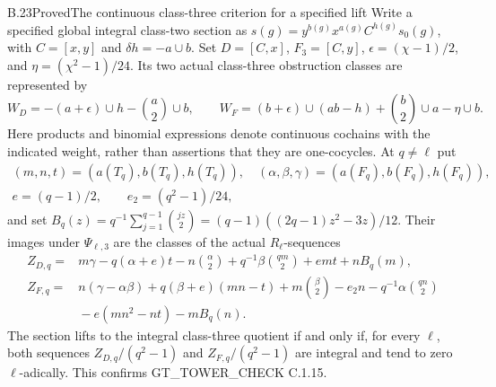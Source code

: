 \begin{result}{B.23}{Proved}{The continuous class-three criterion for a specified lift}
\label{coh:third}
Write a specified global integral class-two section as
$s(g)=y^{b(g)}x^{a(g)}C^{h(g)}s_0(g)$, with $C=[x,y]$ and
$\delta h=-a\cup b$. Set $D=[C,x]$, $F_3=[C,y]$,
$\epsilon=(\chi-1)/2$, and $\eta=(\chi^2-1)/24$.
Its two actual class-three obstruction classes are represented by
\[
 W_D=-(a+\epsilon)\cup h-\binom a2\cup b,\qquad
 W_F=(b+\epsilon)\cup(ab-h)+\binom b2\cup a-\eta\cup b.
\]
Here products and binomial expressions denote continuous cochains
with the indicated weight, rather than assertions that they are
one-cocycles. At $q\ne\ell$ put
\[
 \begin{gathered}
 (m,n,t)=(a(T_q),b(T_q),h(T_q)),\quad
 (\alpha,\beta,\gamma)=(a(F_q),b(F_q),h(F_q)),\\
 e=(q-1)/2,\qquad e_2=(q^2-1)/24,
 \end{gathered}
\]
and set
$B_q(z)=q^{-1}\sum_{j=1}^{q-1}\binom{jz}{2}
       =(q-1)((2q-1)z^2-3z)/12$.
Their images under $\Psi_{\ell,3}$ are the classes of the actual
$R_\ell$-sequences
\begin{align*}
 Z_{D,q}={}&m\gamma-q(\alpha+e)t-n\binom\alpha2
       +q^{-1}\beta\binom{qm}{2}+emt+nB_q(m),\\
 Z_{F,q}={}&n(\gamma-\alpha\beta)+q(\beta+e)(mn-t)
       +m\binom\beta2-e_2n-q^{-1}\alpha\binom{qn}{2}\\
       &{}-e(mn^2-nt)-mB_q(n).
\end{align*}
The section lifts to the integral class-three quotient if and only if,
for every $\ell$, both sequences $Z_{D,q}/(q^2-1)$ and
$Z_{F,q}/(q^2-1)$ are integral and tend to zero $\ell$-adically.
This confirms GT\_TOWER\_CHECK C.1.15.
\end{result}
